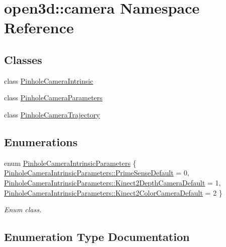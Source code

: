 \hypertarget{namespaceopen3d_1_1camera}{}\section{open3d\+::camera Namespace Reference}
\label{namespaceopen3d_1_1camera}
\subsection*{Classes}
\begin{DoxyCompactItemize}
\item 
class \mbox{\hyperlink{classopen3d_1_1camera_1_1_pinhole_camera_intrinsic}{Pinhole\+Camera\+Intrinsic}}
\item 
class \mbox{\hyperlink{classopen3d_1_1camera_1_1_pinhole_camera_parameters}{Pinhole\+Camera\+Parameters}}
\item 
class \mbox{\hyperlink{classopen3d_1_1camera_1_1_pinhole_camera_trajectory}{Pinhole\+Camera\+Trajectory}}
\end{DoxyCompactItemize}
\subsection*{Enumerations}
\begin{DoxyCompactItemize}
\item 
enum \mbox{\hyperlink{namespaceopen3d_1_1camera_a57dc47ff7ac14e5f8be58be554497793}{Pinhole\+Camera\+Intrinsic\+Parameters}} \{ \mbox{\hyperlink{namespaceopen3d_1_1camera_a57dc47ff7ac14e5f8be58be554497793a1b4af7cb8d6df3561d7447f42f7fdfc0}{Pinhole\+Camera\+Intrinsic\+Parameters\+::\+Prime\+Sense\+Default}} = 0, 
\mbox{\hyperlink{namespaceopen3d_1_1camera_a57dc47ff7ac14e5f8be58be554497793a4d2e2a8ef843aaf15e15f208e3614339}{Pinhole\+Camera\+Intrinsic\+Parameters\+::\+Kinect2\+Depth\+Camera\+Default}} = 1, 
\mbox{\hyperlink{namespaceopen3d_1_1camera_a57dc47ff7ac14e5f8be58be554497793a8937a4c2862b60361e40878aa06eced3}{Pinhole\+Camera\+Intrinsic\+Parameters\+::\+Kinect2\+Color\+Camera\+Default}} = 2
 \}
\begin{DoxyCompactList}\small\item\em Enum class. \end{DoxyCompactList}\end{DoxyCompactItemize}


\subsection{Enumeration Type Documentation}
\mbox{\label{namespaceopen3d_1_1camera_a57dc47ff7ac14e5f8be58be554497793}} 
